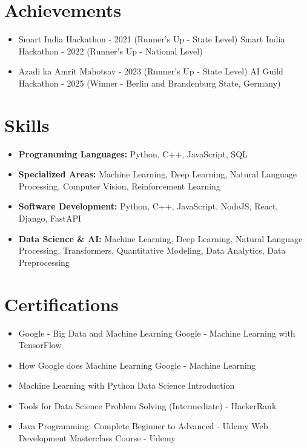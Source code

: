 \documentclass[a4paper,10pt]{article}
\begin{document}
\section*{Achievements}
\begin{itemize}
\item Smart India Hackathon - 2021 (Runner's Up - State Level) \hfill Smart India Hackathon - 2022 (Runner's Up - National Level)
\item Azadi ka Amrit Mahotsav - 2023 (Runner's Up - State Level) \hfill AI Guild Hackathon - 2025 (Winner - Berlin and Brandenburg State, Germany)
\end{itemize}

\section*{Skills}
\begin{itemize}
  \item \textbf{Programming Languages:} Python, C++, JavaScript, SQL
  \item \textbf{Specialized Areas:} Machine Learning, Deep Learning, Natural Language Processing, Computer Vision, Reinforcement Learning
  \item \textbf{Software Development:} Python, C++, JavaScript, NodeJS, React, Django, FastAPI
  \item \textbf{Data Science \& AI:} Machine Learning, Deep Learning, Natural Language Processing, Transformers, Quantitative Modeling, Data Analytics, Data Preprocessing
\end{itemize}

\section*{Certifications}
\begin{itemize}
\item Google - Big Data and Machine Learning \hfill Google - Machine Learning with TensorFlow
\item How Google does Machine Learning \hfill Google - Machine Learning
\item Machine Learning with Python \hfill Data Science Introduction
\item Tools for Data Science \hfill Problem Solving (Intermediate) - HackerRank
\item Java Programming: Complete Beginner to Advanced - Udemy \hfill Web Development Masterclass Course - Udemy
\end{itemize}
\end{document}
